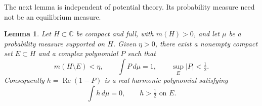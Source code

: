 \documentclass[11pt]{article}
\newcommand{\C}{\mathbb C}
\DeclareMathOperator{\Rea}{Re}
\newtheorem{lemma}[theorem]{Lemma}
\theoremstyle{remark}
\numberwithin{equation}{section}
\begin{document}
The next lemma is independent of potential theory. Its probability
measure need not be an equilibrium measure.

\begin{lemma}\label{lem:corridor}
Let $H\subset\C$ be compact and full, with $m(H)>0$, and let $\mu$
be a probability measure supported on $H$. Given $\eta>0$, there
exist a nonempty compact set $E\subset H$ and a complex polynomial
$P$ such that
\begin{equation}\label{eq:corridor}
 m(H\setminus E)<\eta,\qquad
 \int P\,d\mu=1,\qquad \sup_E|P|<\tfrac12.
\end{equation}
Consequently $h=\Rea(1-P)$ is a real harmonic polynomial satisfying
\begin{equation}\label{eq:centered}
 \int h\,d\mu=0,\qquad h>\tfrac12\text{ on }E.
\end{equation}
\end{lemma}
\end{document}
